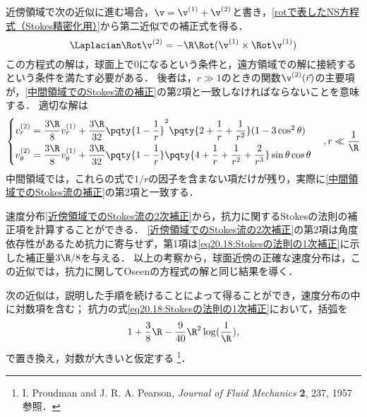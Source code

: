 近傍領域で次の近似に進む場合，$\v = \v^{(1)} + \v^{(2)}$と書き，\eqref{rotで表したNS方程式（Stokes精密化用）}から第二近似での補正式を得る．
\begin{equation}
    \Laplacian\Rot\v^{(2)} = -\R \Rot (\v^{(1)} \times \Rot\v^{(1)} )
\end{equation}
この方程式の解は，球面上で0になるという条件と，遠方領域での解に接続するという条件を満たす必要がある．
後者は，$r \gg 1$のときの関数$\v^{(2)}(\vec{r})$の主要項が，\eqref{中間領域でのStokes流の補正}の第2項と一致しなければならないことを意味する．
適切な解は
\begin{equation}\label{近傍領域でのStokes流の2次補正}
    \begin{cases}
        v_r^{(2)} = \dfrac{3\R}{8}v_r^{(1)} + \dfrac{3\R}{32} \pqty{1-\dfrac{1}{r}}^2 \pqty{ 2 + \dfrac{1}{r} + \dfrac{1}{r^2} }(1-3\cos^2\theta) \\[7pt]
        v_{\theta}^{(2)} = \dfrac{3\R}{8}v_{\theta}^{(1)} + \dfrac{3\R}{32} \pqty{1-\dfrac{1}{r}} \pqty{ 4 + \dfrac{1}{r} + \dfrac{1}{r^2} + \dfrac{2}{r^3} } \sin\theta\cos\theta \\
    \end{cases}
    , r \ll \frac{1}{\R}
\end{equation}
中間領域では，これらの式で$1/r$の因子を含まない項だけが残り，実際に\eqref{中間領域でのStokes流の補正}の第2項と一致する．


速度分布\eqref{近傍領域でのStokes流の2次補正}から，抗力に関するStokesの法則の補正項を計算することができる．
\eqref{近傍領域でのStokes流の2次補正}の第2項は角度依存性があるため抗力に寄与せず，第1項は\eqref{eq20.18:Stokesの法則の1次補正}に示した補正量$3\R/8$を与える．
以上の考察から，球面近傍の正確な速度分布は，この近似では，抗力に関してOseenの方程式の解と同じ結果を導く．


次の近似は，説明した手順を続けることによって得ることができ，速度分布の中に対数項を含む；
抗力の式\eqref{eq20.18:Stokesの法則の1次補正}において，括弧を
\[
    1 + \frac{3}{8}\R -\frac{9}{40}\R^2 \log(\frac{1}{\R}),
\]
で置き換え，対数が大きいと仮定する
\footnote{I. Proudman and J. R. A. Pearson, \textit{Journal of Fluid Mechanics} \textbf{2}, 237, 1957 参照．}．





\BackToTheToc